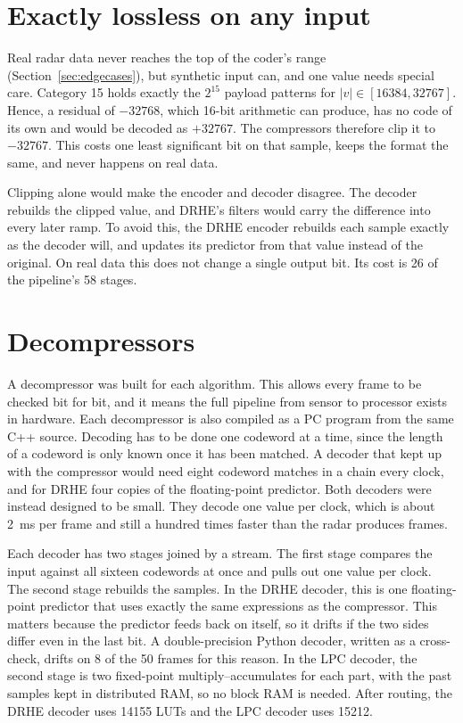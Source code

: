 \section{Exactly lossless on any input}
\label{sec:robust}

Real radar data never reaches the top of the coder's range
(Section~\ref{sec:edgecases}), but synthetic input can, and one value needs
special care. Category 15 holds exactly the $2^{15}$ payload patterns for
$|v| \in [16384, 32767]$. Hence, a residual of $-32768$, which 16-bit
arithmetic can produce, has no code of its own and would be decoded as
$+32767$. The compressors therefore clip it to $-32767$. This costs one least
significant bit on that sample, keeps the format the same, and never happens
on real data.

Clipping alone would make the encoder and decoder disagree. The decoder
rebuilds the clipped value, and DRHE's filters would carry the difference into
every later ramp. To avoid this, the DRHE encoder rebuilds each sample exactly
as the decoder will, and updates its predictor from that value instead of the
original. On real data this does not change a single output bit. Its cost is
26 of the pipeline's 58 stages.

\section{Decompressors}
\label{sec:dechw}

A decompressor was built for each algorithm. This allows every frame to be
checked bit for bit, and it means the full pipeline from sensor to processor
exists in hardware. Each decompressor is also compiled as a PC program from the
same C++ source. Decoding has to be done one codeword at a time, since the
length of a codeword is only known once it has been matched. A decoder that
kept up with the compressor would need eight codeword matches in a chain every
clock, and for DRHE four copies of the floating-point predictor. Both decoders
were instead designed to be small. They decode one value per clock, which is
about \SI{2}{\milli\second} per frame and still a hundred times faster than
the radar produces frames.

Each decoder has two stages joined by a stream. The first stage compares the
input against all sixteen codewords at once and pulls out one value per clock.
The second stage rebuilds the samples. In the DRHE decoder, this is one
floating-point predictor that uses exactly the same expressions as the
compressor. This matters because the predictor feeds back on itself, so it
drifts if the two sides differ even in the last bit. A double-precision Python
decoder, written as a cross-check, drifts on 8 of the 50 frames for this
reason. In the LPC decoder, the second stage is two fixed-point
multiply--accumulates for each part, with the past samples kept in distributed
RAM, so no block RAM is needed. After routing, the DRHE decoder uses
\num{14155} LUTs and the LPC decoder uses \num{15212}.

